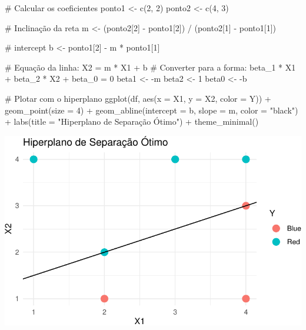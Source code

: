 \documentclass[
  a4paperpaper,
]{article}
\newenvironment{Shaded}{\begin{snugshade}}{\end{snugshade}}
\newcommand{\AttributeTok}[1]{\textcolor[rgb]{0.40,0.45,0.13}{#1}}
\newcommand{\CommentTok}[1]{\textcolor[rgb]{0.37,0.37,0.37}{#1}}
\newcommand{\DecValTok}[1]{\textcolor[rgb]{0.68,0.00,0.00}{#1}}
\newcommand{\FunctionTok}[1]{\textcolor[rgb]{0.28,0.35,0.67}{#1}}
\newcommand{\NormalTok}[1]{\textcolor[rgb]{0.00,0.23,0.31}{#1}}
\newcommand{\OtherTok}[1]{\textcolor[rgb]{0.00,0.23,0.31}{#1}}
\newcommand{\SpecialCharTok}[1]{\textcolor[rgb]{0.37,0.37,0.37}{#1}}
\newcommand{\StringTok}[1]{\textcolor[rgb]{0.13,0.47,0.30}{#1}}
\begin{document}
\begin{Shaded}
\begin{Highlighting}[]
\CommentTok{\# Calcular os coeficientes}
\NormalTok{ponto1 }\OtherTok{\textless{}{-}} \FunctionTok{c}\NormalTok{(}\DecValTok{2}\NormalTok{, }\DecValTok{2}\NormalTok{)}
\NormalTok{ponto2 }\OtherTok{\textless{}{-}} \FunctionTok{c}\NormalTok{(}\DecValTok{4}\NormalTok{, }\DecValTok{3}\NormalTok{)}

\CommentTok{\# Inclinação da reta}
\NormalTok{m }\OtherTok{\textless{}{-}}\NormalTok{ (ponto2[}\DecValTok{2}\NormalTok{] }\SpecialCharTok{{-}}\NormalTok{ ponto1[}\DecValTok{2}\NormalTok{]) }\SpecialCharTok{/}\NormalTok{ (ponto2[}\DecValTok{1}\NormalTok{] }\SpecialCharTok{{-}}\NormalTok{ ponto1[}\DecValTok{1}\NormalTok{])}

\CommentTok{\# intercept}
\NormalTok{b }\OtherTok{\textless{}{-}}\NormalTok{ ponto1[}\DecValTok{2}\NormalTok{] }\SpecialCharTok{{-}}\NormalTok{ m }\SpecialCharTok{*}\NormalTok{ ponto1[}\DecValTok{1}\NormalTok{]}

\CommentTok{\# Equação da linha: X2 = m * X1 + b}
\CommentTok{\# Converter para a forma: beta\_1 * X1 + beta\_2 * X2 + beta\_0 = 0}
\NormalTok{beta1 }\OtherTok{\textless{}{-}} \SpecialCharTok{{-}}\NormalTok{m}
\NormalTok{beta2 }\OtherTok{\textless{}{-}} \DecValTok{1}
\NormalTok{beta0 }\OtherTok{\textless{}{-}} \SpecialCharTok{{-}}\NormalTok{b}

\CommentTok{\# Plotar com o hiperplano}
\FunctionTok{ggplot}\NormalTok{(df, }\FunctionTok{aes}\NormalTok{(}\AttributeTok{x =}\NormalTok{ X1, }\AttributeTok{y =}\NormalTok{ X2, }\AttributeTok{color =}\NormalTok{ Y)) }\SpecialCharTok{+}
  \FunctionTok{geom\_point}\NormalTok{(}\AttributeTok{size =} \DecValTok{4}\NormalTok{) }\SpecialCharTok{+}
  \FunctionTok{geom\_abline}\NormalTok{(}\AttributeTok{intercept =}\NormalTok{ b, }\AttributeTok{slope =}\NormalTok{ m, }\AttributeTok{color =} \StringTok{"black"}\NormalTok{) }\SpecialCharTok{+}
  \FunctionTok{labs}\NormalTok{(}\AttributeTok{title =} \StringTok{"Hiperplano de Separação Ótimo"}\NormalTok{) }\SpecialCharTok{+}
  \FunctionTok{theme\_minimal}\NormalTok{()}
\end{Highlighting}
\end{Shaded}

\includegraphics{lista-5_files/figure-pdf/unnamed-chunk-8-1.pdf}
\end{document}

